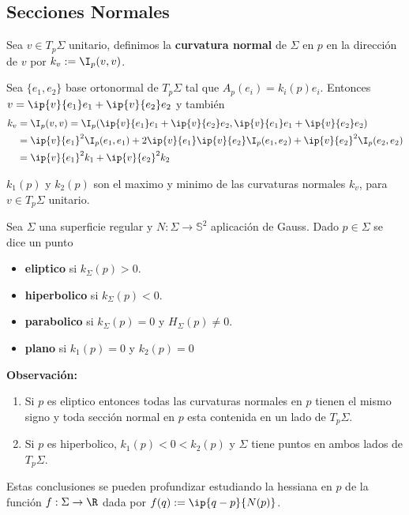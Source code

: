 \documentclass{article}
\begin{document}
\subsection{Secciones Normales}
\begin{dfn}
    Sea $v\in T_{p}\Sigma$ unitario, definimos la \textbf{curvatura normal} de $\Sigma$ en $p$ en
    la dirección de $v$ por $k_{v}:=\I_{p}(v,v)$.
\end{dfn}
\noindent Sea $\{e_{1},e_{2}\}$ base ortonormal de $T_{p}\Sigma$ tal que $A_{p}(e_{i})=
k_{i}(p)e_{i}$. Entonces $v=\ip{v}{e_{1}}e_{1}+\ip{v}{e_{2}}e_{2}$ y también
\begin{align*}
    k_{v} &= \I_{p}(v,v)=\I_{p}(\ip{v}{e_{1}}e_{1}+\ip{v}{e_{2}}e_{2},
    \ip{v}{e_{1}}e_{1}+\ip{v}{e_{2}}e_{2}) \\
    &= \ip{v}{e_{1}}^{2}\I_{p}(e_{1},e_{1})+2\ip{v}{e_{1}}\ip{v}{e_{2}}\I_{p}(e_{1},e_{2})+
    \ip{v}{e_{2}}^{2}\I_{p}(e_{2},e_{2}) \\
    &= \ip{v}{e_{1}}^{2}k_{1}+\ip{v}{e_{2}}^{2}k_{2}
\end{align*}
\begin{cor}
    $k_{1}(p)$ y $k_{2}(p)$ son el maximo y minimo de las curvaturas normales $k_{v}$, para 
    $v\in T_{p}\Sigma$ unitario.
\end{cor}

\begin{dfn}
    Sea $\Sigma$ una superficie regular y $N:\Sigma\to\mathbb{S}^{2}$ aplicación de Gauss. Dado 
    $p\in\Sigma$ se dice un punto
    \begin{itemize}
        \item \textbf{eliptico} si $k_{\Sigma}(p)>0$.
        \item \textbf{hiperbolico} si $k_{\Sigma}(p)<0$.
        \item \textbf{parabolico} si $k_{\Sigma}(p)=0$ y $H_{\Sigma}(p)\neq0$.
        \item \textbf{plano} si $k_{1}(p)=0$ y $k_{2}(p)=0$
    \end{itemize}
\end{dfn}
\noindent\textbf{Observación:}
\begin{enumerate}
    \item Si $p$ es eliptico entonces todas las curvaturas normales en $p$ tienen el mismo signo y
    toda sección normal en $p$ esta contenida en un lado de $T_{p}\Sigma$.

    \item Si $p$ es hiperbolico, $k_{1}(p)<0<k_{2}(p)$ y $\Sigma$ tiene puntos en ambos lados de
    $T_{p}\Sigma$.
\end{enumerate}
Estas conclusiones se pueden profundizar estudiando la hessiana en $p$ de la función 
$f:\Sigma\to\R$ dada por $f(q):=\ip{q-p}{N(p)}$.
\end{document}
